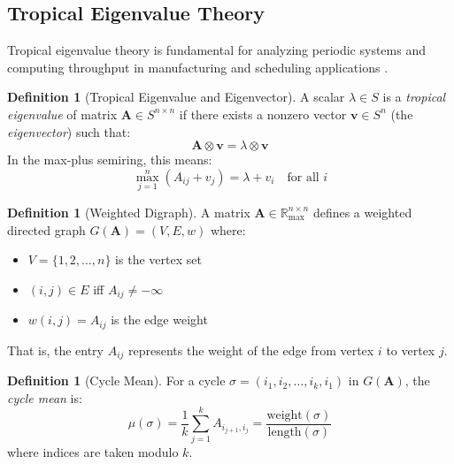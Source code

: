 \documentclass[11pt,a4paper]{article}
\theoremstyle{plain}
\theoremstyle{definition}
\newtheorem{definition}[theorem]{Definition}
\newcommand{\Rmax}{\mathbb{R}_{\max}}
\newcommand{\mat}[1]{\mathbf{#1}}
\newcommand{\vect}[1]{\mathbf{#1}}
\begin{document}
\subsection{Tropical Eigenvalue Theory}
\label{subsec:eigenvalues}

Tropical eigenvalue theory is fundamental for analyzing periodic systems and computing throughput in manufacturing and scheduling applications \cite{baccelli1992synchronization, heidergott2006max}.

\begin{definition}[Tropical Eigenvalue and Eigenvector]
\label{def:eigenvalue}
A scalar $\lambda \in S$ is a \emph{tropical eigenvalue} of matrix $\mat{A} \in S^{n \times n}$ if there exists a nonzero vector $\vect{v} \in S^n$ (the \emph{eigenvector}) such that:
\begin{equation}
    \mat{A} \otimes \vect{v} = \lambda \otimes \vect{v}
\end{equation}
In the max-plus semiring, this means:
\begin{equation}
    \max_{j=1}^{n}(A_{ij} + v_j) = \lambda + v_i \quad \text{for all } i
\end{equation}
\end{definition}

\begin{definition}[Weighted Digraph]
\label{def:weighted-digraph}
A matrix $\mat{A} \in \Rmax^{n \times n}$ defines a weighted directed graph $G(\mat{A}) = (V, E, w)$ where:
\begin{itemize}
    \item $V = \{1, 2, \ldots, n\}$ is the vertex set
    \item $(i, j) \in E$ iff $A_{ij} \neq -\infty$
    \item $w(i, j) = A_{ij}$ is the edge weight
\end{itemize}
That is, the entry $A_{ij}$ represents the weight of the edge from vertex $i$ to vertex $j$.
\end{definition}

\begin{definition}[Cycle Mean]
For a cycle $\sigma = (i_1, i_2, \ldots, i_k, i_1)$ in $G(\mat{A})$, the \emph{cycle mean} is:
\begin{equation}
    \mu(\sigma) = \frac{1}{k}\sum_{j=1}^{k} A_{i_{j+1}, i_j} = \frac{\text{weight}(\sigma)}{\text{length}(\sigma)}
\end{equation}
where indices are taken modulo $k$.
\end{definition}
\end{document}
